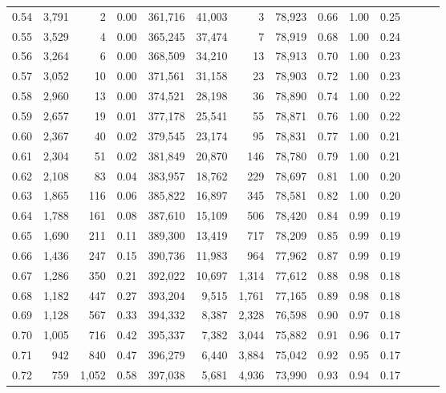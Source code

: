 \begin{tabular}{rrrrrrrrrrrrrr}
0.54 &  3,791 &      2 &  0.00 &  361,716 &   41,003 &       3 &  78,923 &  0.66 &  1.00 &      0.25 \\
0.55 &  3,529 &      4 &  0.00 &  365,245 &   37,474 &       7 &  78,919 &  0.68 &  1.00 &      0.24 \\
0.56 &  3,264 &      6 &  0.00 &  368,509 &   34,210 &      13 &  78,913 &  0.70 &  1.00 &      0.23 \\
0.57 &  3,052 &     10 &  0.00 &  371,561 &   31,158 &      23 &  78,903 &  0.72 &  1.00 &      0.23 \\
0.58 &  2,960 &     13 &  0.00 &  374,521 &   28,198 &      36 &  78,890 &  0.74 &  1.00 &      0.22 \\
0.59 &  2,657 &     19 &  0.01 &  377,178 &   25,541 &      55 &  78,871 &  0.76 &  1.00 &      0.22 \\
0.60 &  2,367 &     40 &  0.02 &  379,545 &   23,174 &      95 &  78,831 &  0.77 &  1.00 &      0.21 \\
0.61 &  2,304 &     51 &  0.02 &  381,849 &   20,870 &     146 &  78,780 &  0.79 &  1.00 &      0.21 \\
0.62 &  2,108 &     83 &  0.04 &  383,957 &   18,762 &     229 &  78,697 &  0.81 &  1.00 &      0.20 \\
0.63 &  1,865 &    116 &  0.06 &  385,822 &   16,897 &     345 &  78,581 &  0.82 &  1.00 &      0.20 \\
0.64 &  1,788 &    161 &  0.08 &  387,610 &   15,109 &     506 &  78,420 &  0.84 &  0.99 &      0.19 \\
0.65 &  1,690 &    211 &  0.11 &  389,300 &   13,419 &     717 &  78,209 &  0.85 &  0.99 &      0.19 \\
0.66 &  1,436 &    247 &  0.15 &  390,736 &   11,983 &     964 &  77,962 &  0.87 &  0.99 &      0.19 \\
0.67 &  1,286 &    350 &  0.21 &  392,022 &   10,697 &   1,314 &  77,612 &  0.88 &  0.98 &      0.18 \\
0.68 &  1,182 &    447 &  0.27 &  393,204 &    9,515 &   1,761 &  77,165 &  0.89 &  0.98 &      0.18 \\
0.69 &  1,128 &    567 &  0.33 &  394,332 &    8,387 &   2,328 &  76,598 &  0.90 &  0.97 &      0.18 \\
0.70 &  1,005 &    716 &  0.42 &  395,337 &    7,382 &   3,044 &  75,882 &  0.91 &  0.96 &      0.17 \\
0.71 &    942 &    840 &  0.47 &  396,279 &    6,440 &   3,884 &  75,042 &  0.92 &  0.95 &      0.17 \\
0.72 &    759 &  1,052 &  0.58 &  397,038 &    5,681 &   4,936 &  73,990 &  0.93 &  0.94 &      0.17 \\

\end{tabular}
